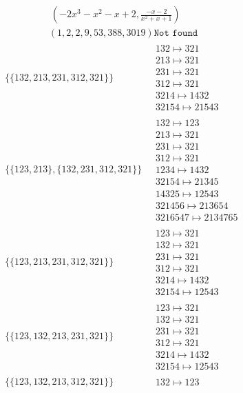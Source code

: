 \begin{scriptsize}
$$\begin{matrix}
\ 
\left(-2 x^{3} - x^{2} - x + 2, \frac{-x - 2}{x^{2} + x + 1}\right)
\\
\left(1, 2, 2, 9, 53, 388, 3019\right)
\texttt{Not found}
\end{matrix}
$$
\begin{align}
\{\{132, 213, 231, 312, 321\}\}
\ 
&
\begin{matrix}
132 \mapsto 321
\\
213 \mapsto 321
\\
231 \mapsto 321
\\
312 \mapsto 321
\\
3214 \mapsto 1432
\\
32154 \mapsto 21543
\end{matrix}
\\
\{\{123, 213\}, \{132, 231, 312, 321\}\}
\ 
&
\begin{matrix}
132 \mapsto 123
\\
213 \mapsto 321
\\
231 \mapsto 321
\\
312 \mapsto 321
\\
1234 \mapsto 1432
\\
32154 \mapsto 21345
\\
14325 \mapsto 12543
\\
321456 \mapsto 213654
\\
3216547 \mapsto 2134765
\end{matrix}
\\
\{\{123, 213, 231, 312, 321\}\}
\ 
&
\begin{matrix}
123 \mapsto 321
\\
132 \mapsto 321
\\
231 \mapsto 321
\\
312 \mapsto 321
\\
3214 \mapsto 1432
\\
32154 \mapsto 12543
\end{matrix}
\\
\{\{123, 132, 213, 231, 321\}\}
\ 
&
\begin{matrix}
123 \mapsto 321
\\
132 \mapsto 321
\\
231 \mapsto 321
\\
312 \mapsto 321
\\
3214 \mapsto 1432
\\
32154 \mapsto 12543
\end{matrix}
\\
\{\{123, 132, 213, 312, 321\}\}
\ 
&
\begin{matrix}
132 \mapsto 123

\end{matrix}
\end{align}
\end{scriptsize}
